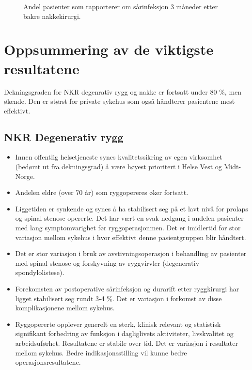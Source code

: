 \documentclass [norsk,a4paper,twoside]{article}\usepackage[]{graphicx}\usepackage[]{color}
\begin{document}
\begin{figure}[ht]
\caption{\label{fig:NakkeKomplinfek3mndSh} Andel pasienter som rapporterer om sårinfeksjon 3 måneder etter bakre nakkekirurgi.}
\end{figure}




\clearpage
\section{Oppsummering av de viktigste resultatene}

Dekningsgraden for NKR degenrativ rygg og nakke er fortsatt under 80 \%, men økende. Den er størst for private sykehus som også håndterer pasientene mest effektivt.
\subsection*{NKR Degenerativ rygg} 
\begin{itemize}
\item Innen offentlig helsetjeneste synes kvalitetssikring  av egen virksomhet (bedømt ut fra dekningsgrad) å
være høyest prioritert i Helse Vest og Midt-Norge.
\item Andelen eldre (over 70 år) som ryggopereres øker fortsatt.
\item Liggetiden er synkende og synes å ha stabilisert seg på et lavt nivå for prolaps og spinal stenose opererte. Det har vært en svak nedgang i andelen pasienter med lang symptomvarighet før ryggoperasjonmen. Det er imidlertid for stor variasjon mellom sykehus i hvor effektivt denne pasientgruppen blir håndtert.
\item Det er stor variasjon i bruk av avstivningsoperasjon i behandling av pasienter med spinal stenose og forskyvning av ryggvirvler (degenerativ spondylolistese).
\item Forekomsten av postoperative sårinfeksjon  og durarift etter ryggkirurgi har ligget stabilisert seg rundt 3-4 \%. Det er  variasjon i forkomst av disse komplikasjonene mellom sykehus. 
\item Ryggopererte opplever generelt en sterk, klinisk relevant og statistisk
signifikant forbedring av funksjon i dagliglivets aktiviteter, livskvalitet og
arbeidsuførhet. Resultatene er stabile over tid. Det er variasjon i resultater mellom sykehus. Bedre indikasjonsstilling vil kunne bedre operasjonsresultatene.
\end{itemize} 
\end{document}
